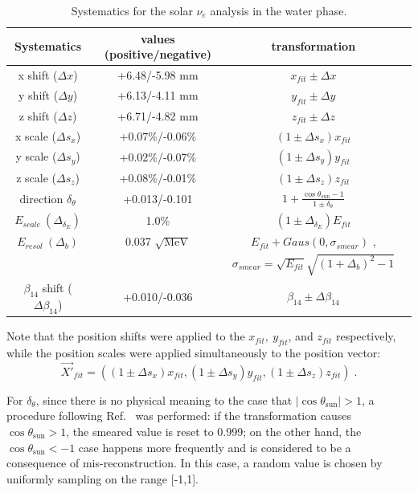\begin{table}[ht]
	\centering
	\caption{Systematics for the solar $\nu_e$ analysis in the water phase.\label{tab:solar_uncertainties}}
	
	\begin{tabular*}{150mm}{c@{\extracolsep{\fill}}ccc}
		\toprule
		Systematics & values (positive/negative) & transformation   \\
		\hline
		x shift ($\Delta x$) & +6.48/-5.98 mm  & $x_{fit}\pm \Delta x$ \\	
		y shift ($\Delta y$)& +6.13/-4.11 mm   & $y_{fit}\pm \Delta y$ \\
		z shift ($\Delta z$)& +6.71/-4.82 mm   & $z_{fit}\pm \Delta z$ \\
		x scale ($\Delta s_x$)& +0.07\%/-0.06\%  & $(1\pm \Delta s_x)x_{fit}$\\	
		y scale ($\Delta s_y$)& +0.02\%/-0.07\%  & $(1\pm \Delta s_y)y_{fit}$ \\
		z scale ($\Delta s_z$)& +0.08\%/-0.01\%  & $(1\pm \Delta s_z)z_{fit}$ \\
		direction $\delta_\theta$  & +0.013/-0.101 & $1+\frac{\cos\theta_\mathrm{sun}-1}{1\pm\delta_\theta}$\\
		$E_{scale}~(\Delta_{\delta_E})$ &  1.0\%  & $(1\pm \Delta_{\delta_E})E_{fit}$\\
		$E_{resol}~(\Delta_b)$ &  0.037 $\sqrt{\mathrm{MeV}}$  & $E_{fit}+Gaus(0,\sigma_{smear})$ , \\
		& &$\sigma_{smear}=\sqrt{E_{fit}}\sqrt{(1+\Delta_b)^2-1}$\\
		$\beta_{14}$ shift ($\Delta \beta_{14}$) & +0.010/-0.036 & $\beta_{14}\pm \Delta \beta_{14}$\\
		\bottomrule
	\end{tabular*}
\end{table}

Note that the position shifts were applied to the $x_{fit},~y_{fit}$, and $z_{fit}$ respectively, while the position scales were applied simultaneously to the position vector: 
\begin{equation*}
\vec{X'}_{fit}=((1\pm \Delta s_x)x_{fit},(1\pm \Delta s_y)y_{fit},(1\pm \Delta s_z)z_{fit})\; .
\end{equation*}

For $\delta_\theta$, since there is no physical meaning to the case that $\vert \cos\theta_\mathrm{sun} \vert >1$, a procedure following Ref.~\cite{waterunidoc} was performed: if the transformation causes $\cos\theta_\mathrm{sun}>1$, the smeared value is reset to 0.999; on the other hand, the $\cos\theta_\mathrm{sun}<-1$ case happens more frequently and is considered to be a consequence of mis-reconstruction. In this case, a random value is chosen by uniformly sampling on the range [-1,1].

